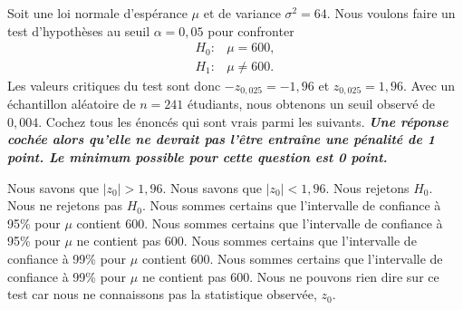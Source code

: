 \begin{questions}

\vspace{0.5cm}
\question[4] Soit une loi normale d'espérance $\mu$ et de variance $\sigma^2=64$.
Nous voulons faire un test d'hypothèses au seuil $\alpha=0,05$ pour confronter 
\begin{align*}
    H_0:&\mu=600,\\
    H_1:&\mu\neq 600.
\end{align*} 
Les valeurs critiques du test sont donc $-z_{0,025}=-1,96$ et $z_{0,025}=1,96$.
Avec un échantillon aléatoire de $n=241$ étudiants, nous obtenons un seuil observé de $0,004$. 
Cochez tous les énoncés qui sont vrais parmi les suivants. \textit{\textbf{Une réponse cochée alors qu'elle ne devrait pas l'être entraîne une pénalité de 1 point. Le minimum possible pour cette question est 0 point.}}
 
\begin{checkboxes}
\correctchoice Nous savons que $|z_0|>1,96$.
\choice Nous savons que $|z_0|<1,96$.
\correctchoice Nous rejetons $H_0$.
\choice Nous ne rejetons pas $H_0$.
\choice Nous sommes certains que l'intervalle de confiance à 95\% pour $\mu$ contient 600.
\correctchoice Nous sommes certains que l'intervalle de confiance à 95\% pour $\mu$ ne contient pas 600.
\choice Nous sommes certains que l'intervalle de confiance à 99\% pour $\mu$
 contient 600.
\choice Nous sommes certains que l'intervalle de confiance à 99\% pour $\mu$ ne contient pas 600.
\choice Nous ne pouvons rien dire sur ce test car nous ne connaissons pas la statistique observée, $z_0$.
\end{checkboxes}
\vspace{0.5cm}



\end{questions}
